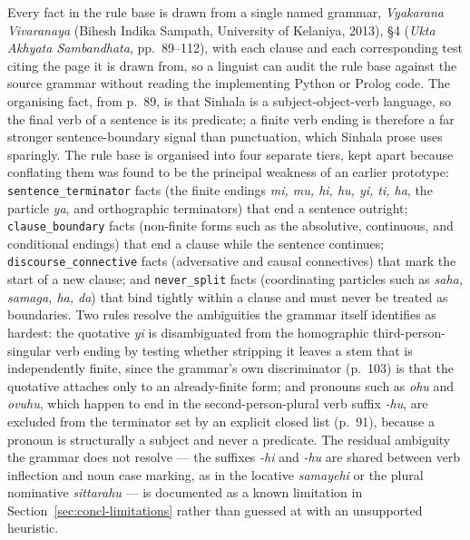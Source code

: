 \documentclass[12pt,a4paper,oneside]{report}
\begin{document}
Every fact in the rule base is drawn from a single named grammar, \textit{Vyakarana Vivaranaya} (Bihesh Indika Sampath, University of Kelaniya, 2013), \S4 (\textit{Ukta Akhyata Sambandhata}, pp.\ 89--112), with each clause and each corresponding test citing the page it is drawn from, so a linguist can audit the rule base against the source grammar without reading the implementing Python or Prolog code. The organising fact, from p.\ 89, is that Sinhala is a subject-object-verb language, so the final verb of a sentence is its predicate; a finite verb ending is therefore a far stronger sentence-boundary signal than punctuation, which Sinhala prose uses sparingly. The rule base is organised into four separate tiers, kept apart because conflating them was found to be the principal weakness of an earlier prototype: \texttt{sentence\_terminator} facts (the finite endings \textit{mi, mu, hi, hu, yi, ti, ha}, the particle \textit{ya}, and orthographic terminators) that end a sentence outright; \texttt{clause\_boundary} facts (non-finite forms such as the absolutive, continuous, and conditional endings) that end a clause while the sentence continues; \texttt{discourse\_connective} facts (adversative and causal connectives) that mark the start of a new clause; and \texttt{never\_split} facts (coordinating particles such as \textit{saha, samaga, ha, da}) that bind tightly within a clause and must never be treated as boundaries. Two rules resolve the ambiguities the grammar itself identifies as hardest: the quotative \textit{yi} is disambiguated from the homographic third-person-singular verb ending by testing whether stripping it leaves a stem that is independently finite, since the grammar's own discriminator (p.\ 103) is that the quotative attaches only to an already-finite form; and pronouns such as \textit{ohu} and \textit{ovuhu}, which happen to end in the second-person-plural verb suffix \textit{-hu}, are excluded from the terminator set by an explicit closed list (p.\ 91), because a pronoun is structurally a subject and never a predicate. The residual ambiguity the grammar does not resolve --- the suffixes \textit{-hi} and \textit{-hu} are shared between verb inflection and noun case marking, as in the locative \textit{samayehi} or the plural nominative \textit{sittarahu} --- is documented as a known limitation in Section~\ref{sec:concl-limitations} rather than guessed at with an unsupported heuristic.
\end{document}
